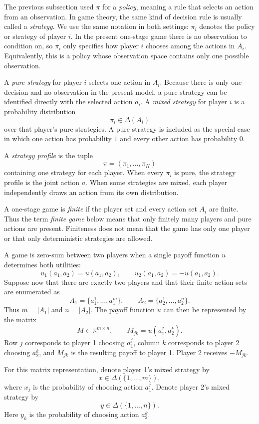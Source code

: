 The previous subsection used $\pi$ for a \emph{policy}, meaning a rule that selects an action from an observation. In game theory, the same kind of decision rule is usually called a \emph{strategy}. We use the same notation in both settings: $\pi_i$ denotes the policy or strategy of player $i$. In the present one-stage game there is no observation to condition on, so $\pi_i$ only specifies how player $i$ chooses among the actions in $A_i$. Equivalently, this is a policy whose observation space contains only one possible observation.

A \emph{pure strategy} for player $i$ selects one action in $A_i$. Because there is only one decision and no observation in the present model, a pure strategy can be identified directly with the selected action $a_i$. A \emph{mixed strategy} for player $i$ is a probability distribution
\[
    \pi_i\in\Delta(A_i)
\]
over that player's pure strategies. A pure strategy is included as the special case in which one action has probability $1$ and every other action has probability $0$.

A \emph{strategy profile} is the tuple
\[
    \pi=(\pi_1,\ldots,\pi_K)
\]
containing one strategy for each player. When every $\pi_i$ is pure, the strategy profile is the joint action $a$. When some strategies are mixed, each player independently draws an action from its own distribution.

A one-stage game is \emph{finite} if the player set and every action set $A_i$ are finite. Thus the term \emph{finite game} below means that only finitely many players and pure actions are present. Finiteness does not mean that the game has only one player or that only deterministic strategies are allowed.

A game is zero-sum between two players when a single payoff function $u$ determines both utilities:
\[
    u_1(a_1,a_2)=u(a_1,a_2),
    \qquad
    u_2(a_1,a_2)=-u(a_1,a_2).
\]
Suppose now that there are exactly two players and that their finite action sets are enumerated as
\[
    A_1=\{a_1^1,\ldots,a_1^m\},
    \qquad
    A_2=\{a_2^1,\ldots,a_2^n\}.
\]
Thus $m=|A_1|$ and $n=|A_2|$. The payoff function $u$ can then be represented by the matrix
\[
    M\in\mathbb{R}^{m\times n},
    \qquad
    M_{jk}=u(a_1^j,a_2^k).
\]
Row $j$ corresponds to player 1 choosing $a_1^j$, column $k$ corresponds to player 2 choosing $a_2^k$, and $M_{jk}$ is the resulting payoff to player 1. Player 2 receives $-M_{jk}$.

For this matrix representation, denote player 1's mixed strategy by
\[
    x\in\Delta(\{1,\ldots,m\}),
\]
where $x_j$ is the probability of choosing action $a_1^j$. Denote player 2's mixed strategy by
\[
    y\in\Delta(\{1,\ldots,n\}).
\]
Here $y_k$ is the probability of choosing action $a_2^k$.

